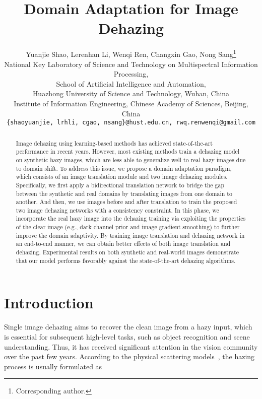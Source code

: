 \documentclass[10pt,twocolumn,letterpaper]{article}
\begin{document}
\title{Domain Adaptation for Image Dehazing}


\author{
	Yuanjie Shao, 
	Lerenhan Li, 
	Wenqi Ren, 
	Changxin Gao, 
	Nong Sang\thanks{Corresponding author.}\\
	National Key Laboratory of Science and Technology on Multispectral Information Processing,\\
	School of Artificial Intelligence and Automation, \\
	Huazhong University of Science and Technology, Wuhan, China\\
	Institute of Information Engineering, Chinese Academy of Sciences, Beijing, China\\
	{\tt\small \{shaoyuanjie, lrhli, cgao, nsang\}@hust.edu.cn, rwq.renwenqi@gmail.com}
}

\maketitle
\thispagestyle{empty}
\begin{abstract}
Image dehazing using learning-based methods has achieved state-of-the-art performance in recent years.
However, most existing methods train a dehazing model on synthetic hazy images, which are less able to generalize well to real hazy images due to domain shift.
To address this issue, we propose a domain adaptation paradigm,
which consists of an image translation module and two image dehazing modules. 
Specifically, we first apply a bidirectional translation network to bridge the gap between the synthetic and real domains by translating images from one domain to another.
And then, we use images before and after translation to train the proposed two image dehazing networks with a consistency constraint.
In this phase, we incorporate the real hazy image into the dehazing training via exploiting the properties of the clear image (e.g., dark channel prior and image gradient smoothing) to further improve the domain adaptivity.
By training image translation and dehazing network in an end-to-end manner, we can obtain better effects of both image translation and dehazing.
Experimental results on both synthetic and real-world images demonstrate that our model performs favorably against the state-of-the-art dehazing algorithms.
\end{abstract}

\section{Introduction}
Single image dehazing aims to recover the clean image from a hazy input,
which is essential for subsequent high-level tasks, such as object recognition and scene understanding.
Thus, it has received significant attention in the vision community over the past few years.
According to the physical scattering models~\cite{mccartney1976optics,narasimhan2002vision,li2017haze}, the hazing process is usually formulated as
\end{document}
